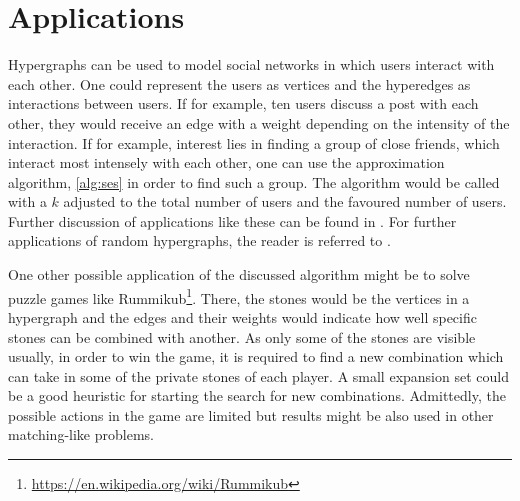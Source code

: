 \chapter{Applications}\label{chapter:applications}
Hypergraphs can be used to model social networks in which users interact with each other. One could represent the users as vertices and the hyperedges as interactions between users. If for example, ten users discuss a post with each other, they would receive an edge with a weight depending on the intensity of the interaction. If for example, interest lies in finding a group of close friends, which interact most intensely with each other, one can use the approximation algorithm, \cref{alg:ses} in order to find such a group. The algorithm would be called with a $k$ adjusted to the total number of users and the favoured number of users. Further discussion of applications like these can be found in \cite{zhang2010hypergraph}. For further applications of random hypergraphs, the reader is referred to \cite{ghoshal2009random}.

One other possible application of the discussed algorithm might be to solve puzzle games like Rummikub\footnote{\href{https://en.wikipedia.org/wiki/Rummikub}{https://en.wikipedia.org/wiki/Rummikub}}. There, the stones would be the vertices in a hypergraph and the edges and their weights would indicate how well specific stones can be combined with another. As only some of the stones are visible usually, in order to win the game, it is required to find a new combination which can take in some of the private stones of each player. A small expansion set could be a good heuristic for starting the search for new combinations. Admittedly, the possible actions in the game are limited but results might be also used in other matching-like problems.

